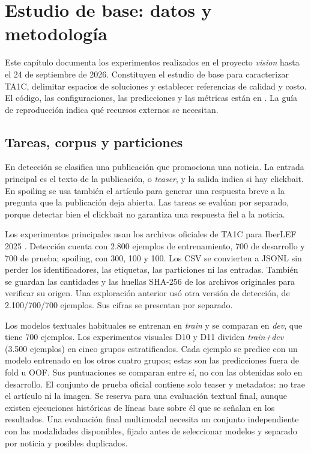 \chapter[Estudio de base: metodología]{Estudio de base: datos y metodología}
\label{cap:metodologia}

Este capítulo documenta los experimentos realizados en el proyecto \emph{vision}
hasta el 24 de septiembre de 2026. Constituyen el estudio de base para
caracterizar TA1C, delimitar espacios de soluciones y establecer referencias
de calidad y costo. El código,
las configuraciones, las predicciones y las métricas están en
. La guía de reproducción indica qué recursos externos
se necesitan.

\section{Tareas, corpus y particiones}

En detección se clasifica una publicación que promociona una noticia. La
entrada principal es el texto de la publicación, o \emph{teaser}, y la salida
indica si hay clickbait. En spoiling se usa también el artículo para generar
una respuesta breve a la pregunta que la publicación deja abierta. Las tareas
se evalúan por separado, porque detectar bien el clickbait no garantiza una
respuesta fiel a la noticia.

Los experimentos principales usan los archivos oficiales de TA1C para
IberLEF 2025 \citep{ta1c2025}. Detección cuenta con 2.800 ejemplos de
entrenamiento, 700 de desarrollo y 700 de prueba; spoiling, con 300, 100 y
100. Los CSV se convierten a JSONL sin perder los identificadores, las
etiquetas, las particiones ni las entradas. También se guardan las cantidades
y las huellas SHA-256 de los archivos originales para verificar su origen.
Una exploración anterior usó otra versión de detección, de
2.100/700/700 ejemplos. Sus cifras se presentan por separado.

Los modelos textuales habituales se entrenan en \emph{train} y se comparan
en \emph{dev}, que tiene 700 ejemplos. Los experimentos visuales D10 y D11
dividen \emph{train+dev} (3.500 ejemplos) en cinco grupos estratificados.
Cada ejemplo se predice con un modelo entrenado en los otros cuatro grupos;
estas son las predicciones fuera de fold u OOF. Sus puntuaciones se comparan
entre sí, no con las obtenidas solo en desarrollo. El conjunto de prueba
oficial contiene solo teaser y metadatos: no trae el artículo ni la imagen.
Se reserva para una evaluación textual final, aunque existen ejecuciones
históricas de líneas base sobre él que se señalan en los resultados. Una
evaluación final multimodal necesita un conjunto independiente con las
modalidades disponibles, fijado antes de seleccionar modelos y separado por
noticia y posibles duplicados.


